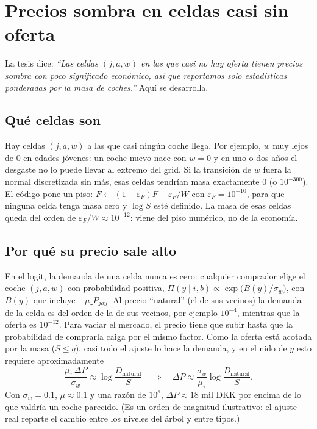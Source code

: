 \documentclass{article}
\begin{document}
\section{Precios sombra en celdas casi sin oferta}

La tesis dice: \emph{``Las celdas $(j,a,w)$ en las que casi no hay oferta tienen precios sombra con
poco significado económico, así que reportamos solo estadísticas ponderadas por la masa de coches.''}
Aquí se desarrolla.

\subsection{Qué celdas son}

Hay celdas $(j,a,w)$ a las que casi ningún coche llega. Por ejemplo, $w$ muy lejos de 0 en edades
jóvenes: un coche nuevo nace con $w=0$ y en uno o dos años el desgaste no lo puede llevar al extremo
del grid. Si la transición de $w$ fuera la normal discretizada sin más, esas celdas tendrían masa
exactamente 0 (o $10^{-300}$). El código pone un piso: $F\leftarrow(1-\varepsilon_F)F+\varepsilon_F/W$ con
$\varepsilon_F=10^{-10}$, para que ninguna celda tenga masa cero y $\log S$ esté definido. La masa
de esas celdas queda del orden de $\varepsilon_F/W\approx10^{-12}$: viene del piso numérico, no de la economía.

\subsection{Por qué su precio sale alto}

En el logit, la demanda de una celda nunca es cero: cualquier comprador elige el coche $(j,a,w)$
con probabilidad positiva, $\Pi(y\mid i,b)\propto\exp\big(B(y)/\sigma_w\big)$, con $B(y)$ que
incluye $-\mu_\tau P_{jay}$. Al precio ``natural'' (el de sus vecinos) la demanda de la celda es del
orden de la de sus vecinos, por ejemplo $10^{-4}$, mientras que la oferta es $10^{-12}$. Para vaciar
el mercado, el precio tiene que subir hasta que la probabilidad de comprarla caiga por el mismo
factor. Como la oferta está acotada por la masa ($S\le q$), casi todo el ajuste lo hace la demanda,
y en el nido de $y$ esto requiere aproximadamente
$$\frac{\mu_\tau\,\Delta P}{\sigma_w}\approx\log\frac{D_{\text{natural}}}{S}
\quad\Longrightarrow\quad
\Delta P\approx\frac{\sigma_w}{\mu_\tau}\log\frac{D_{\text{natural}}}{S}.$$
Con $\sigma_w=0.1$, $\mu\approx0.1$ y una razón de $10^{8}$, $\Delta P\approx18$ mil DKK por encima de lo que
valdría un coche parecido. (Es un orden de magnitud ilustrativo: el ajuste real reparte el cambio entre
los niveles del árbol y entre tipos.)
\end{document}
